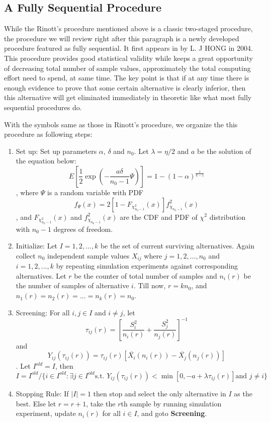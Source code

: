 \documentclass[12pt,a4]{report}
\begin{document}
\subsection{A Fully Sequential Procedure}

While the Rinott's procedure mentioned above is a classic two-staged procedure, the procedure we will review right after this paragraph is a newly developed procedure featured as fully sequential. It first appears in \cite{ras-seq-jeff} by L. J HONG in 2004. This procedure provides good statistical validity while keeps a great opportunity of decreasing total number of sample values, approximately the total computing effort need to spend, at same time. The key point is that if at any time there is enough evidence to prove that some certain alternative is clearly inferior, then this alternative will get eliminated immediately in theoretic like what most fully sequential procedures do.

With the symbols same as those in Rinott's procedure, we organize the this procedure as following steps:

\begin{enumerate}
\item{Set up: } Set up parameters $\alpha$, $\delta$ and $n_0$. Let $\lambda = \eta / 2$ and $a$ be the solution of the equation below:
$$ E[\frac{1}{2}\exp(- \frac{a\delta}{n_0 - 1} \Psi)] = 1 - (1 - \alpha)^{\frac{1}{k - 1}} $$,
where $\Psi$ is a random variable with PDF
$$ f_{\Psi}(x) = 2 [1 - F_{\chi_{n_0 - 1}^2}(x)] f_{\chi_{n_0 - 1}}^2(x) $$,
and $F_{\chi_{n_0 - 1}^2}(x)$ and $f_{\chi_{n_0 - 1}}^2(x)$ are the CDF and PDF of $\chi^2$ distribution with $n_0 - 1$ degrees of freedom.
\item{Initialize: } Let $I = {1, 2,...,k}$ be the set of current surviving alternatives. Again collect $n_0$ independent sample values $X_{ij}$ where $j = 1, 2,...,n_0$ and $i = 1, 2,...,k$ by repeating simulation experiments against corresponding alternatives. Let $r$ be the counter of total number of samples and $n_i(r)$ be the number of samples of alternative $i$. Till now, $r = kn_0$, and $n_1(r) = n_2(r) = ... = n_k(r) = n_0$.
\item{Screening: } For all $i,j \in I$ and $i \neq j$, let 
$$ \tau_{ij}(r) = [\frac{S_i^2}{n_i(r)} + \frac{S_j^2}{n_j(r)}]^{-1} $$
and
$$ Y_{ij}(\tau_{ij}(r)) = \tau_{ij}(r)[\bar{X_i}(n_i(r)) - \bar{X_j}(n_j(r))] $$.
Let $I^{old} = I$, then
$$ I = I^{old}/\{i \in I^{old}: \exists j \in I^{old} \text{s.t. } Y_{ij}(\tau_{ij}(r)) < \min[0, - a + \lambda \tau_{ij}(r)]  \text{and } j \neq i\} $$
\item{Stopping Rule: } If $|I| = 1$ then stop and select the only alternative in $I$ as the best. Else let $r = r + 1$, take the $r$th sample by running simulation experiment, update $n_i(r)$ for all $i \in I$, and goto \textbf{Screening}.
\end{enumerate}
\end{document}
